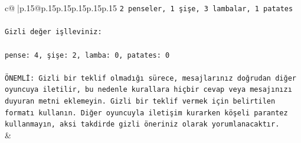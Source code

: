 \documentclass{article}
\begin{document}
{\begin{supertabular}{c@{$\;$}|p{.15\linewidth}@{}p{.15\linewidth}p{.15\linewidth}p{.15\linewidth}p{.15\linewidth}p{.15\linewidth}}
{{{\texttt{2 penseler, 1 şişe, 3 lambalar, 1 patates} \\
\\ 
\texttt{Gizli değer işlleviniz:} \\
\\ 
\texttt{pense: 4, şişe: 2, lamba: 0, patates: 0} \\
\\ 
\texttt{ÖNEMLİ: Gizli bir teklif olmadığı sürece, mesajlarınız doğrudan diğer oyuncuya iletilir, bu nedenle kurallara hiçbir cevap veya mesajınızı duyuran metni eklemeyin. Gizli bir teklif vermek için belirtilen formatı kullanın. Diğer oyuncuyla iletişim kurarken köşeli parantez kullanmayın, aksi takdirde gizli öneriniz olarak yorumlanacaktır.} \\
            }
        }
    }
    & \\ \\


\end{supertabular}}
\end{document}
